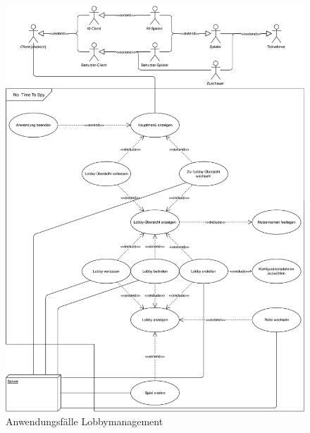 \begin{figure}
  \centering
  \includegraphics[width=\textwidth]{Meilenstein02/use_case_lobbymanagement.pdf}
  \caption{Anwendungsfälle Lobbymanagement}
\end{figure}